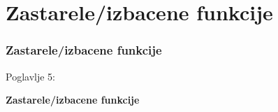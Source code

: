 %

\section{Zastarele/izbacene funkcije}
\begin{frame}[fragile]
	\frametitle{Zastarele/izbacene funkcije}

	\begin{center}\huge{Poglavlje 5:}\end{center}
	\begin{center}\huge{\color{typo3darkgrey}\textbf{Zastarele/izbacene funkcije}}\end{center}

\end{frame}


